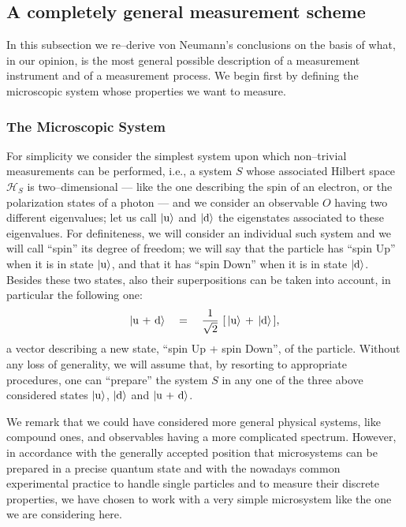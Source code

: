 \documentclass[12pt]{article}
\begin{document}
\subsection{A completely general measurement scheme} \label{sec22}

In this subsection we re--derive von Neumann's conclusions on the
basis of what, in our opinion, is the most general possible
description of a measurement instrument and of a measurement
process. We begin first by defining the microscopic system whose
properties we want to measure.

\subsubsection{The Microscopic System} \label{sec221}

For simplicity we consider the simplest system upon which
non--trivial measurements can be performed, i.e., a system $S$
whose associated Hilbert space ${\mathcal H}_{S}$ is
two--dimensional  --- like the one describing the spin of an
electron, or the polarization states of a photon --- and we
consider  an observable $O$  having two different eigenvalues; let
us call $|\makebox{u}\rangle$ and $|\makebox{d}\rangle$ the
eigenstates associated to these eigenvalues. For definiteness, we
will consider an individual such system and we will call ``spin''
its degree of freedom;  we will say that the particle has ``spin
Up'' when it is in state $|\makebox{u}\rangle$, and that it has
``spin Down'' when it is in state $|\makebox{d}\rangle$. Besides
these two states, also their superpositions can be taken into
account, in particular the following one:
\[
| \makebox{u + d}\rangle \quad =\quad \frac{1}{\sqrt{2}}\,\,[\,
|\makebox{u}\rangle\, +\, |\makebox{d}\rangle\,],
\]
a vector describing a new state, ``spin Up + spin Down'', of the
particle. Without any loss of generality, we will assume that, by
resorting to appropriate procedures, one can ``prepare'' the
system $S$ in any one of the three above considered states
$|\makebox{u}\rangle$, $|\makebox{d}\rangle$ and $|\makebox{u +
d}\rangle$.

We remark that we could have considered more general physical
systems, like compound ones, and observables having a more
complicated spectrum. However, in accordance with the generally
accepted position  that microsystems can be prepared in  a precise
quantum state and with the nowadays common experimental practice
to  handle single particles and to measure their discrete
properties, we have chosen to work with a very simple microsystem
like the one we are considering here.
\end{document}
